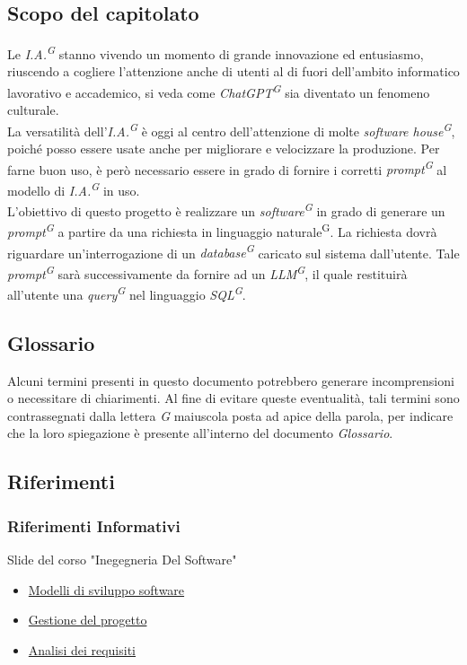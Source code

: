 \documentclass[5pt]{article}
\begin{document}
\subsection{Scopo del capitolato}
Le \textit{I.A.\textsuperscript{G}} stanno vivendo un momento di grande innovazione ed entusiasmo, 
riuscendo a cogliere l'attenzione anche di utenti al di fuori dell'ambito informatico lavorativo e accademico, 
si veda come \textit{ChatGPT\textsuperscript{G}} sia diventato un fenomeno culturale. \\
La versatilità dell'\textit{I.A.\textsuperscript{G}} è oggi al centro dell'attenzione di molte \textit{software house\textsuperscript{G}}, 
poiché posso essere usate anche per migliorare e velocizzare la produzione. 
Per farne buon uso, è però necessario essere in grado di fornire i corretti \textit{prompt\textsuperscript{G}} al 
modello di \textit{I.A.\textsuperscript{G}} in uso. \\


L'obiettivo di questo progetto è realizzare un \textit{software\textsuperscript{G}} in grado di generare 
un \textit{prompt\textsuperscript{G}} a partire da una richiesta in linguaggio naturale\textsuperscript{G}. La richiesta dovrà riguardare un'interrogazione 
di un \textit{database\textsuperscript{G}} caricato sul sistema dall'utente. Tale \textit{prompt\textsuperscript{G}} sarà successivamente da fornire 
ad un \textit{LLM\textsuperscript{G}}, il quale restituirà all'utente una \textit{query\textsuperscript{G}} nel linguaggio 
\textit{SQL\textsuperscript{G}}.

\subsection{Glossario}
Alcuni termini presenti in questo documento potrebbero generare incomprensioni o necessitare di chiarimenti. 
Al fine di evitare queste eventualità, tali termini sono contrassegnati dalla lettera \textit{G} maiuscola posta ad apice della parola, 
per indicare che la loro spiegazione è presente all'interno del documento \textit{Glossario}.

\subsection{Riferimenti}
\subsubsection{Riferimenti Informativi}
Slide del corso "Inegegneria Del Software"
\begin{itemize}
      \item \href{https://www.math.unipd.it/~tullio/IS-1/2023/Dispense/T3.pdf}{Modelli di sviluppo software}
      \item \href{https://www.math.unipd.it/~tullio/IS-1/2023/Dispense/T4.pdf}{Gestione del progetto}
      \item \href{https://www.math.unipd.it/~tullio/IS-1/2023/Dispense/T5.pdf}{Analisi dei requisiti} 
\end{itemize}
\end{document}
